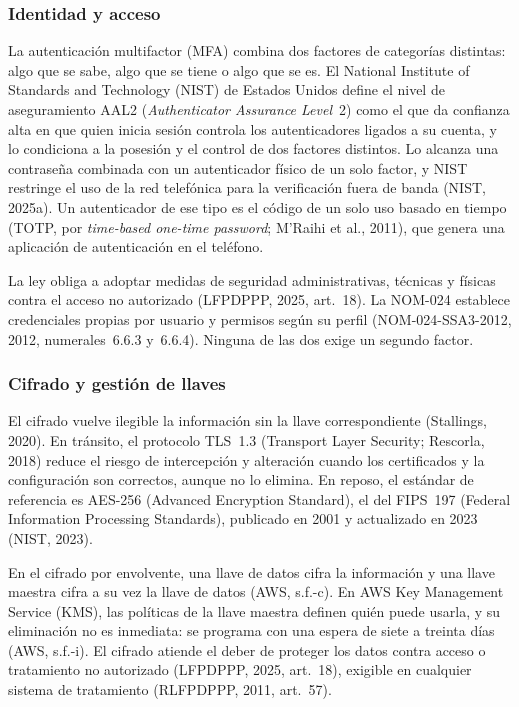 \documentclass[12pt, a4paper]{article}
\begin{document}
\subsubsection{Identidad y acceso}
 
La autenticación multifactor (MFA) combina
dos factores de categorías distintas: algo que se sabe, algo que se tiene o
algo que se es. El National Institute of Standards and Technology (NIST) de
Estados Unidos define el nivel de aseguramiento AAL2
(\textit{Authenticator Assurance Level}~2) como el que da confianza alta
en que quien inicia sesión controla los autenticadores ligados a su
cuenta, y lo condiciona a la posesión y el control de dos factores
distintos. Lo alcanza una contraseña combinada con un autenticador físico de un solo factor, y NIST restringe el uso de la red telefónica para la verificación fuera de banda (NIST, 2025a). Un autenticador de ese tipo es
el código de un solo uso basado en tiempo (TOTP, por \textit{time-based one-time password}; M'Raihi et al., 2011), que genera una aplicación de autenticación en el teléfono.

La
ley obliga a adoptar medidas de seguridad administrativas, técnicas y
físicas contra el acceso no autorizado (LFPDPPP, 2025, art.~18). La
NOM-024 establece credenciales propias por usuario y permisos según su
perfil (NOM-024-SSA3-2012, 2012, numerales~6.6.3 y~6.6.4). Ninguna de
las dos exige un segundo factor.
 
\subsubsection{Cifrado y gestión de llaves}
 
El cifrado vuelve ilegible la información sin la llave correspondiente (Stallings, 2020). En tránsito, el protocolo TLS~1.3 (Transport Layer Security; Rescorla, 2018) reduce el riesgo de intercepción y
alteración cuando los certificados y la configuración son correctos,
aunque no lo elimina. En reposo, el estándar de referencia es AES-256 (Advanced Encryption Standard), el del FIPS~197 (Federal Information Processing Standards),
publicado en 2001 y actualizado en 2023 (NIST, 2023).

En el cifrado por envolvente, una llave de datos cifra la información y una llave maestra cifra a su vez la llave de datos (AWS, s.f.-c). En AWS Key Management Service (KMS), las políticas de la llave maestra definen quién puede usarla, y su eliminación no es inmediata: se programa con una espera de siete a treinta días
(AWS, s.f.-i). El cifrado atiende el
deber de proteger los datos
contra acceso o tratamiento no autorizado (LFPDPPP, 2025,
art.~18), exigible en cualquier sistema de tratamiento (RLFPDPPP,
2011, art.~57).
 
\end{document}
